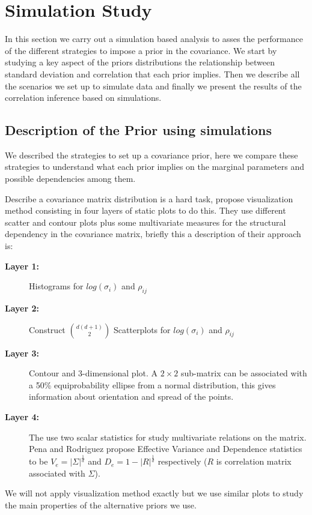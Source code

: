 \documentclass{article}
\begin{document}
\section{Simulation Study}
In this section we carry out a simulation based analysis to asses the performance of the different strategies to impose a prior in the covariance. We start by studying a key aspect of the priors distributions the relationship between standard deviation and correlation that each prior implies. Then we describe all the scenarios we set up to simulate data and finally we present the results of the correlation inference based on simulations.  

\subsection{Description  of the Prior using simulations } 
We described the strategies to set up a covariance prior, here we compare these strategies to understand what each prior implies on the marginal parameters and possible dependencies among them. 

Describe a covariance matrix distribution is a hard task, \cite{visualize} propose visualization method consisting in four layers of static plots to do this. They use different scatter and contour plots plus some multivariate measures for the structural dependency in the covariance matrix, briefly this a description of their approach is: 
\begin{description}
	\item[\textbf{Layer 1:}] Histograms for $log(\sigma_i)$ and $\rho_{ij}$ 
	\item[\textbf{Layer 2:}] Construct $ {d(d+1) \choose 2}  $ Scatterplots for $log(\sigma_i)$ and $\rho_{ij}$ 
	\item[\textbf{Layer 3:}] Contour and 3-dimensional plot. A $2\times2$ sub-matrix can be associated with a 50\% equiprobability ellipse from a normal distribution, this gives information about orientation and spread of the points. 
	\item[\textbf{Layer 4:}] The use two scalar statistics for study multivariate relations on the matrix. Pena and Rodriguez propose Effective Variance and Dependence statistics to be $V_e = |\Sigma|^{\frac{1}{d}}$ and $D_e=1-|R|^{\frac{1}{d}}$ respectively ($R$ is correlation matrix associated with $\Sigma$). 
\end{description}

We will not apply \cite{visualize} visualization method exactly but we use similar plots to study the main properties of the alternative priors we use. 
 
\end{document}
